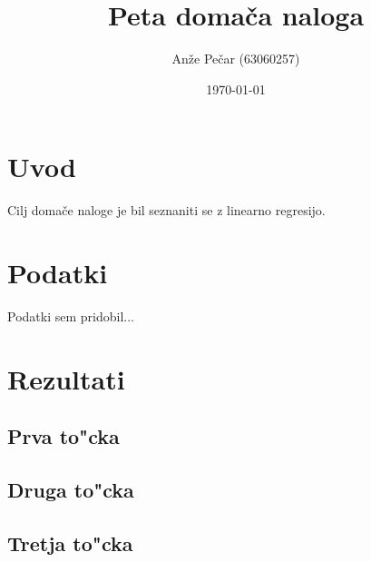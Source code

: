 \documentclass[a4paper,11pt]{article}
\title{Peta domača naloga}
\author{Anže Pečar (63060257)}
\date{\today}
\begin{document}
\maketitle

\section{Uvod}

Cilj domače naloge je bil seznaniti se z linearno regresijo.
\section{Podatki}

Podatki sem pridobil...

\section{Rezultati}
\subsection{Prva to"cka}
\subsection{Druga to"cka}
\subsection{Tretja to"cka}

%
\end{document}

